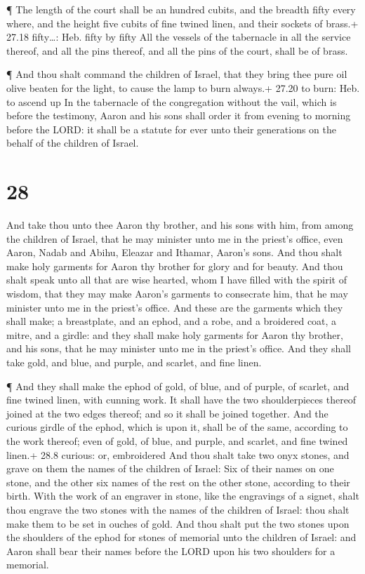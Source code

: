  ¶ The length of the court shall be an hundred cubits, and
the breadth fifty every where, and the height five cubits of fine twined
linen, and their sockets of brass.+ 27.18 fifty\ldots: Heb. fifty by
fifty  All the vessels of the tabernacle in all the service
thereof, and all the pins thereof, and all the pins of the court, shall
be of brass.

 ¶ And thou shalt command the children of Israel, that they
bring thee pure oil olive beaten for the light, to cause the lamp to
burn always.+ 27.20 to burn: Heb. to ascend up  In the
tabernacle of the congregation without the vail, which is before the
testimony, Aaron and his sons shall order it from evening to morning
before the LORD: it shall be a statute for ever unto their generations
on the behalf of the children of Israel.

\hypertarget{section-27}{%
\section{28}\label{section-27}}

 And take thou unto thee Aaron thy brother, and his sons
with him, from among the children of Israel, that he may minister unto
me in the priest's office, even Aaron, Nadab and Abihu, Eleazar and
Ithamar, Aaron's sons.  And thou shalt make holy garments
for Aaron thy brother for glory and for beauty.  And thou
shalt speak unto all that are wise hearted, whom I have filled with the
spirit of wisdom, that they may make Aaron's garments to consecrate him,
that he may minister unto me in the priest's office.  And
these are the garments which they shall make; a breastplate, and an
ephod, and a robe, and a broidered coat, a mitre, and a girdle: and they
shall make holy garments for Aaron thy brother, and his sons, that he
may minister unto me in the priest's office.  And they shall
take gold, and blue, and purple, and scarlet, and fine linen.

 ¶ And they shall make the ephod of gold, of blue, and of
purple, of scarlet, and fine twined linen, with cunning work.
 It shall have the two shoulderpieces thereof joined at the
two edges thereof; and so it shall be joined together.  And
the curious girdle of the ephod, which is upon it, shall be of the same,
according to the work thereof; even of gold, of blue, and purple, and
scarlet, and fine twined linen.+ 28.8 curious: or, embroidered
 And thou shalt take two onyx stones, and grave on them the
names of the children of Israel:  Six of their names on one
stone, and the other six names of the rest on the other stone, according
to their birth.  With the work of an engraver in stone,
like the engravings of a signet, shalt thou engrave the two stones with
the names of the children of Israel: thou shalt make them to be set in
ouches of gold.  And thou shalt put the two stones upon the
shoulders of the ephod for stones of memorial unto the children of
Israel: and Aaron shall bear their names before the LORD upon his two
shoulders for a memorial.

